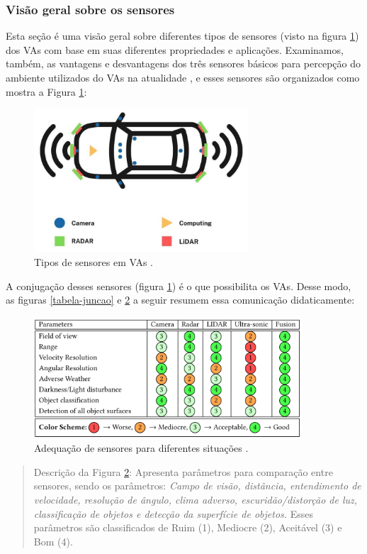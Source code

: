  

\subsubsection{Visão geral sobre os sensores} \label{sensores}

Esta seção é uma visão geral sobre diferentes tipos de sensores (visto na figura \ref{figura-sensores}) dos VAs com base em suas diferentes propriedades e aplicações. Examinamos, também, as vantagens e desvantagens dos três sensores básicos para percepção do ambiente utilizados do VAs na atualidade \cite{sensors}, e esses sensores são organizados como mostra a Figura \ref{figura-sensores}:


\begin{figure}[H]
\centering
\includegraphics[width=8cm]{Figures/sensores.png}
\caption{Tipos de sensores em VAs \cite{review-auto}.}
\label{figura-sensores}
\end{figure}


A conjugação desses sensores (figura \ref{figura-sensores}) é o que possibilita os VAs. Desse modo, as figuras \ref{tabela-juncao} e \ref{all-sense} a seguir resumem essa comunicação didaticamente:

\begin{figure}[H]
\centering
\includegraphics[width=10cm]{Figures/all-sense.png}
\caption{Adequação de sensores para diferentes situações \cite{sensors-yet}.}
\label{all-sense}
\end{figure}
\begin{quote}
Descrição da Figura \ref{all-sense}: Apresenta parâmetros para comparação entre sensores, sendo os parâmetros: \textit{Campo de visão, distância, entendimento de velocidade, resolução de ângulo, clima adverso, escuridão/distorção de luz, classificação de objetos e detecção da superfície de objetos.} Esses parâmetros são classificados de Ruim (1), Mediocre (2), Aceitável (3) e Bom (4).
\end{quote}

